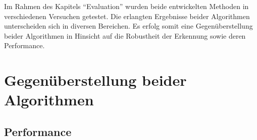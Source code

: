 Im Rahmen des Kapitels \enquote{Evaluation} wurden beide entwickelten Methoden in verschiedenen Versuchen getestet. Die erlangten Ergebnisse beider Algorithmen unterscheiden sich in diversen Bereichen. Es erfolg somit eine Gegenüberstellung beider Algorithmen in Hinsicht auf die Robustheit der Erkennung sowie deren Performance.







% 

\section{Gegenüberstellung beider Algorithmen}
\label{sec:gegenueberstellung}

\subsection{Performance}
\label{subsec:discussion_performance}

